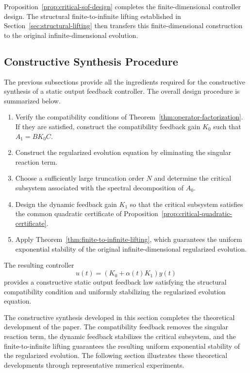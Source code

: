 \documentclass[pdflatex,sn-mathphys-num]{sn-jnl}
\theoremstyle{thmstyleone}%
\theoremstyle{thmstyletwo}%
\theoremstyle{thmstylethree}%
\begin{document}
Proposition~\ref{prop:critical-sof-design} completes the finite-dimensional controller design. The structural finite-to-infinite lifting established in Section~\ref{sec:structural-lifting} then transfers this finite-dimensional construction to the original infinite-dimensional evolution.

\subsection{Constructive Synthesis Procedure}
\label{subsec:constructive-procedure}

The previous subsections provide all the ingredients required for the constructive synthesis of a static output feedback controller. The overall design procedure is summarized below.

\begin{enumerate}

\item
Verify the compatibility conditions of Theorem~\ref{thm:operator-factorization}. If they are satisfied, construct the compatibility feedback gain
\(
K_0
\)
such that
\(
A_1=BK_0C.
\)

\item
Construct the regularized evolution equation by eliminating the singular reaction term.

\item
Choose a sufficiently large truncation order
\(
N
\)
and determine the critical subsystem associated with the spectral decomposition of \(A_0\).

\item
Design the dynamic feedback gain
\(
K_1
\)
so that the critical subsystem satisfies the common quadratic certificate of Proposition~\ref{prop:critical-quadratic-certificate}.

\item
Apply Theorem~\ref{thm:finite-to-infinite-lifting}, which guarantees the uniform exponential stability of the original infinite-dimensional regularized evolution.

\end{enumerate}

The resulting controller
\[
u(t)
=
\left(
K_0+\alpha(t)K_1
\right)
y(t)
\]
provides a constructive static output feedback law satisfying the structural compatibility condition and uniformly stabilizing the regularized evolution equation.

The constructive synthesis developed in this section completes the theoretical development of the paper. The compatibility feedback removes the singular reaction term, the dynamic feedback stabilizes the critical subsystem, and the finite-to-infinite lifting guarantees the resulting uniform exponential stability of the regularized evolution. The following section illustrates these theoretical developments through representative numerical experiments.
\end{document}
